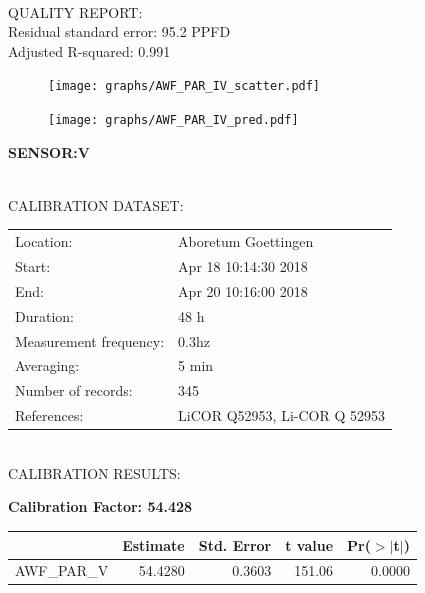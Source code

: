 \documentclass[oneside]{report}
\begin{document}
\hrulefill\\
QUALITY REPORT:\\
Residual standard error: 95.2 PPFD\\
Adjusted R-squared: 0.991



\begin{figure}[H]
  \centering
  \texttt{[image: graphs/AWF\_PAR\_IV\_scatter.pdf]}
\end{figure}




\begin{figure}[H]
  \centering
  \texttt{[image: graphs/AWF\_PAR\_IV\_pred.pdf]}
\end{figure}

\pagebreak


\begin{center}
\large{\textbf{SENSOR:V}}\\
\end{center}

\hrulefill\\
CALIBRATION DATASET:\\
\begin{table}[h!]
  \centering
  \label{tab:table1}
  \begin{tabular}{ll}
    Location: & Aboretum Goettingen\\ 
    
    
    Start:  & Apr 18 10:14:30 2018 \\
    End:   & Apr 20 10:16:00 2018\\ 
    Duration: & 48 h\\
    Measurement frequency: & 0.3hz\\
    Averaging:  &5 min\\
    Number of records: & 345 \\
    References: & LiCOR Q52953, Li-COR Q 52953 \\
  \end{tabular}
\end{table}

\hrulefill\\
CALIBRATION RESULTS:\\


\begin{center}
\textbf{\large{Calibration Factor: 54.428}}\\
\end{center}
\begin{table}[ht]
\centering
\begin{tabular}{rrrrr}
  \hline
 & Estimate & Std. Error & t value & Pr($>$$|$t$|$) \\ 
  \hline
AWF\_PAR\_V & 54.4280 & 0.3603 & 151.06 & 0.0000 \\ 
   \hline
\end{tabular}
\end{table}
\end{document}

